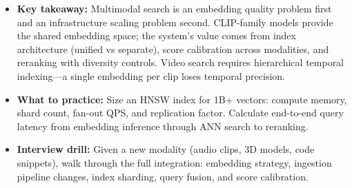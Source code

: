 \begin{itemize}
  \item \textbf{Key takeaway:} Multimodal search is an embedding quality problem first and an infrastructure scaling problem second. CLIP-family models provide the shared embedding space; the system's value comes from index architecture (unified vs separate), score calibration across modalities, and reranking with diversity controls. Video search requires hierarchical temporal indexing---a single embedding per clip loses temporal precision.
  \item \textbf{What to practice:} Size an HNSW index for 1B+ vectors: compute memory, shard count, fan-out QPS, and replication factor. Calculate end-to-end query latency from embedding inference through ANN search to reranking.
  \item \textbf{Interview drill:} Given a new modality (audio clips, 3D models, code snippets), walk through the full integration: embedding strategy, ingestion pipeline changes, index sharding, query fusion, and score calibration.
\end{itemize}
